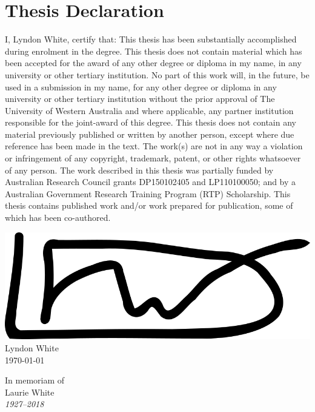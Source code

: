 \documentclass{book}
\begin{document}
\section*{Thesis Declaration}
\vskip 0.8cm
\begin{flushleft}
	I, Lyndon White, certify that:
	\vskip 0.5cm 
	This thesis has been substantially accomplished during enrolment in the degree.
	\vskip 0.25cm
	This thesis does not contain material which has been accepted for the award of any other degree or diploma in my name, in any university or other tertiary institution.
	\vskip 0.25cm
	No part of this work will, in the future, be used in a submission in my name, for any other degree or diploma in any university or other tertiary institution without the prior approval of The University of Western Australia and where applicable, any partner institution responsible for the joint-award of this degree.
	\vskip 0.25cm
	This thesis does not contain any material previously published or written by another person, except where due reference has been made in the text. 
	\vskip 0.25cm
	The work(s) are not in any way a violation or infringement of any copyright, trademark, patent, or other rights whatsoever of any person.
	\vskip 0.25cm
	The work described in this thesis was partially funded by 
	Australian Research Council grants DP150102405 and LP110100050;
	and by a Australian Government Research Training Program (RTP) Scholarship.
	\vskip 0.25cm
	This thesis contains published work and/or work prepared for publication, some of which has been co-authored. 
	\vskip 0.5cm

	\includegraphics[height=2\baselineskip]{signatures/white}
	\vskip 0.15cm
	Lyndon White\\
	\today
\end{flushleft}




{%
	\cleardoublepage
	\thispagestyle{empty}
	\centering
	{
		In memoriam of\\
		Laurie White\\
		\emph{1927--2018}\\
	}
	\clearpage
}
\end{document}
